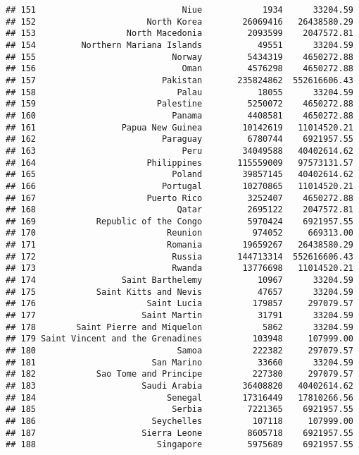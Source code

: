 \documentclass[
]{article}
\begin{document}
\begin{verbatim}
## 151                             Niue            1934      33204.59
## 152                      North Korea        26069416   26438580.29
## 153                  North Macedonia         2093599    2047572.81
## 154         Northern Mariana Islands           49551      33204.59
## 155                           Norway         5434319    4650272.88
## 156                             Oman         4576298    4650272.88
## 157                         Pakistan       235824862  552616606.43
## 158                            Palau           18055      33204.59
## 159                        Palestine         5250072    4650272.88
## 160                           Panama         4408581    4650272.88
## 161                 Papua New Guinea        10142619   11014520.21
## 162                         Paraguay         6780744    6921957.55
## 163                             Peru        34049588   40402614.62
## 164                      Philippines       115559009   97573131.57
## 165                           Poland        39857145   40402614.62
## 166                         Portugal        10270865   11014520.21
## 167                      Puerto Rico         3252407    4650272.88
## 168                            Qatar         2695122    2047572.81
## 169            Republic of the Congo         5970424    6921957.55
## 170                          Reunion          974052     669313.00
## 171                          Romania        19659267   26438580.29
## 172                           Russia       144713314  552616606.43
## 173                           Rwanda        13776698   11014520.21
## 174                 Saint Barthelemy           10967      33204.59
## 175            Saint Kitts and Nevis           47657      33204.59
## 176                      Saint Lucia          179857     297079.57
## 177                     Saint Martin           31791      33204.59
## 178        Saint Pierre and Miquelon            5862      33204.59
## 179 Saint Vincent and the Grenadines          103948     107999.00
## 180                            Samoa          222382     297079.57
## 181                       San Marino           33660      33204.59
## 182            Sao Tome and Principe          227380     297079.57
## 183                     Saudi Arabia        36408820   40402614.62
## 184                          Senegal        17316449   17810266.56
## 185                           Serbia         7221365    6921957.55
## 186                       Seychelles          107118     107999.00
## 187                     Sierra Leone         8605718    6921957.55
## 188                        Singapore         5975689    6921957.55

\end{verbatim}
\end{document}
